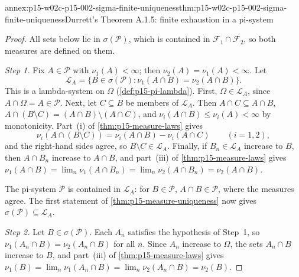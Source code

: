 \begin{annexitem}{annex:p15-w02c-p15-002-sigma-finite-uniqueness}{thm:p15-w02c-p15-002-sigma-finite-uniqueness}{Durrett's Theorem A.1.5: finite exhaustion in a pi-system}
\begin{proof}
All sets below lie in \(\sigma(\mathcal P)\), which is contained in
\(\mathcal F_1\cap\mathcal F_2\), so both measures are defined on them.

\emph{Step 1.} Fix \(A\in\mathcal P\) with \(\nu_1(A)<\infty\); then
\(\nu_2(A)=\nu_1(A)<\infty\). Let
\[
 \mathcal L_A=\{B\in\sigma(\mathcal P):\nu_1(A\cap B)=\nu_2(A\cap B)\}.
\]
This is a lambda-system on \(\Omega\) (\cref{def:p15-pi-lambda}).
First, \(\Omega\in\mathcal L_A\), since \(A\cap\Omega=A\in\mathcal P\).
Next, let \(C\subseteq B\) be members of \(\mathcal L_A\). Then
\(A\cap C\subseteq A\cap B\),
\(A\cap(B\setminus C)=(A\cap B)\setminus(A\cap C)\), and
\(\nu_i(A\cap B)\leq\nu_i(A)<\infty\) by monotonicity. Part~(i) of
\cref{thm:p15-measure-laws} gives
\[
 \nu_i(A\cap(B\setminus C))=\nu_i(A\cap B)-\nu_i(A\cap C)\qquad(i=1,2),
\]
and the right-hand sides agree, so \(B\setminus C\in\mathcal L_A\).
Finally, if \(B_n\in\mathcal L_A\) increase to \(B\), then
\(A\cap B_n\) increase to \(A\cap B\), and part~(iii) of
\cref{thm:p15-measure-laws} gives
\(\nu_1(A\cap B)=\lim_n\nu_1(A\cap B_n)=\lim_n\nu_2(A\cap B_n)=\nu_2(A\cap B)\).

The pi-system \(\mathcal P\) is contained in \(\mathcal L_A\): for
\(B\in\mathcal P\), \(A\cap B\in\mathcal P\), where the measures agree.
The first statement of \cref{thm:p15-measure-uniqueness} now gives
\(\sigma(\mathcal P)\subseteq\mathcal L_A\).

\emph{Step 2.} Let \(B\in\sigma(\mathcal P)\). Each \(A_n\) satisfies the
hypothesis of Step~1, so \(\nu_1(A_n\cap B)=\nu_2(A_n\cap B)\) for all
\(n\). Since \(A_n\) increase to \(\Omega\), the sets \(A_n\cap B\)
increase to \(B\), and part~(iii) of \cref{thm:p15-measure-laws} gives
\(\nu_1(B)=\lim_n\nu_1(A_n\cap B)=\lim_n\nu_2(A_n\cap B)=\nu_2(B)\).
\end{proof}
\end{annexitem}

